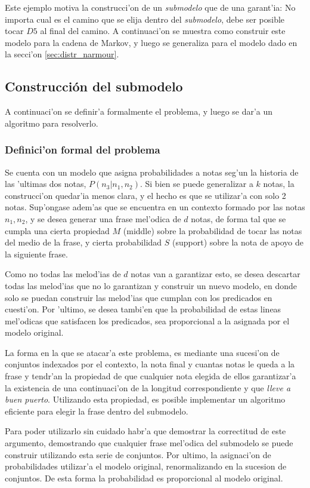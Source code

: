 Este ejemplo motiva la construcci'on de un \emph{submodelo} que de una garant'ia: No importa cual es el camino que se elija dentro
del \emph{submodelo}, debe ser posible tocar $D5$ al final del camino. A continuaci'on se muestra como construir este modelo para
la cadena de Markov, y luego se generaliza para el modelo dado en la secci'on \ref{sec:distr_narmour}.


\subsection{Construcci\'on del submodelo}
A continuaci'on se definir'a formalmente el problema, y luego se dar'a un algoritmo para resolverlo.
\subsubsection{Definici'on formal del problema}
Se cuenta con un modelo que asigna probabilidades a notas seg'un la historia de las 'ultimas dos notas, $P(n_3 | n_1, n_2)$. Si bien se puede generalizar a $k$ notas,
la construcci'on quedar'ia menos clara, y el hecho es que se utilizar'a con solo 2 notas. Sup'ongase adem'as que se encuentra en un contexto formado por las notas 
$n_1, n_2$, y se desea generar una frase mel'odica de $d$ notas, de forma tal que se cumpla una cierta propiedad $M$ (middle) sobre la probabilidad de tocar las notas
del medio de la frase, y cierta probabilidad $S$ (support) sobre la nota de apoyo de la siguiente frase.

Como no todas las melod'ias de $d$ notas van a garantizar esto, se desea descartar todas las melod'ias que no lo garantizan y construir un nuevo modelo, en donde
solo se puedan construir las melod'ias que cumplan con los predicados en cuesti'on. Por 'ultimo, se desea tambi'en que la probabilidad de estas lineas mel'odicas 
que satisfacen los predicados, sea proporcional a la asignada por el modelo original. 

La forma en la que se atacar'a este problema, es mediante una sucesi'on de conjuntos indexados por el contexto, la nota final y cuantas notas le queda
a la frase y tendr'an la propiedad de que cualquier nota elegida de ellos garantizar'a la existencia de una continuaci'on de la longitud correspondiente 
 y que \emph{lleve a buen puerto}. Utilizando esta propiedad, es posible implementar un algoritmo eficiente para elegir la frase dentro del submodelo. 

Para poder utilizarlo sin cuidado habr'a que demostrar la correctitud de este argumento, demostrando que cualquier frase mel'odica del submodelo se puede construir
utilizando esta serie de conjuntos. Por ultimo, la asignaci'on de probabilidades utilizar'a el modelo original, renormalizando en la sucesion de conjuntos. De esta 
forma la probabilidad es proporcional al modelo original.

